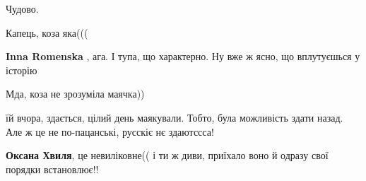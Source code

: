 \begin{itemize}
 
Чудово.

 
Капець, коза яка(((

\begin{itemize}
 
\textbf{Inna Romenska} , ага. І тупа, що характерно. Ну вже ж ясно, що вплутуєшься у історію

 
Мда, коза не зрозуміла маячка))

 
їй вчора, здається, цілий день маякували. Тобто, була можливість здати назад.
Але ж це не по-пацанські, русскіє нє здаютссса!

 
\textbf{Оксана Хвиля}, це невиліковне(( і ти ж диви, приїхало воно й одразу свої порядки встановлює!!

 


\end{itemize}
\end{itemize}
